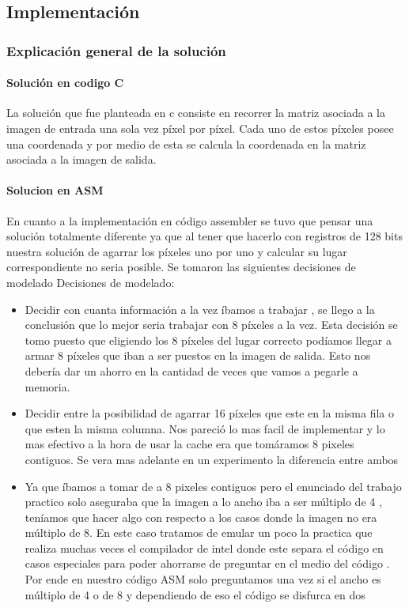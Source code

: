 \subsection{Implementación}
\subsubsection*{Explicación general de la solución}
\paragraph{Solución en codigo C}
La solución que fue planteada en c consiste en recorrer la matriz asociada a la imagen de entrada una sola vez píxel por píxel. Cada uno de estos píxeles posee una coordenada y por medio de esta se calcula la coordenada en la matriz asociada a la imagen de salida. 


\paragraph{Solucion en ASM}
En cuanto a la implementación en código assembler se tuvo que pensar una solución totalmente diferente ya que al tener que hacerlo con registros de 128 bits nuestra solución de agarrar los píxeles uno por uno y calcular su lugar correspondiente no seria posible. Se tomaron las siguientes decisiones de modelado Decisiones de modelado:
\begin{itemize}
\item Decidir con cuanta información a la vez íbamos a trabajar , se llego a la conclusión que lo mejor seria trabajar con 8 píxeles a la vez. Esta decisión se tomo puesto que eligiendo los 8 píxeles del lugar correcto podíamos llegar a armar 8 píxeles que iban a ser puestos en la imagen de salida. Esto nos debería dar un ahorro en la cantidad de veces que vamos a pegarle a memoria.
\item Decidir entre la posibilidad de agarrar 16 píxeles que este en la misma fila o que esten la misma columna. Nos pareció lo mas facil de implementar y lo mas efectivo a la hora de usar la cache era que tomáramos 8 pixeles contiguos. Se vera mas adelante en un experimento la diferencia entre ambos
\item Ya que íbamos a tomar de a 8 pixeles contiguos pero el enunciado del trabajo practico solo aseguraba que la imagen a lo ancho iba a ser múltiplo de 4 , teníamos que hacer algo con respecto a los casos donde la imagen no era múltiplo de 8. En este caso tratamos de emular un poco la practica que realiza muchas veces el compilador de intel donde este separa el código en casos especiales para poder ahorrarse de preguntar en el medio del código . Por ende en nuestro código ASM solo preguntamos una vez si el ancho es múltiplo de 4 o de 8 y dependiendo de eso el código se disfurca en dos
\end{itemize}

